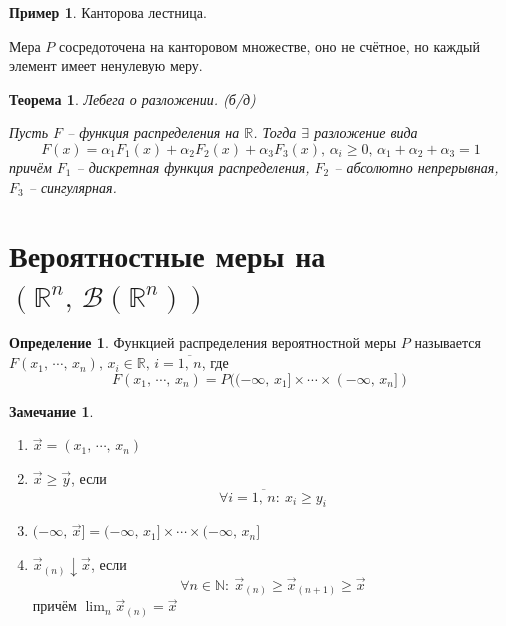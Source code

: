 \documentclass[a4paper,12pt]{article}
\renewcommand{\geq}{\ensuremath{\geqslant}}
\theoremstyle{plain}
\newtheorem{theorem}{Теорема}[section]
\theoremstyle{definition}
\newtheorem{definition}{Определение}[section]
\newtheorem*{note}{Замечание}
\newtheorem*{example}{Пример}
\theoremstyle{remark}
\begin{document}
\begin{example}
	Канторова лестница.

	Мера $P$ сосредоточена на канторовом множестве, оно не счётное, но каждый элемент имеет ненулевую меру.
\end{example}

\begin{theorem}
	Лебега о разложении. (б/д)

	Пусть $F$ -- функция распределения на $\mathbb{R}$. Тогда $\exists$ разложение вида
	\[F(x) = \alpha_1F_1(x) + \alpha_2F_2(x) + \alpha_3F_3(x),\, \alpha_i \geq 0,\, \alpha_1 + \alpha_2 + \alpha_3 = 1\]
	причём $F_1$ -- дискретная функция распределения, $F_2$ -- абсолютно непрерывная, $F_3$ -- сингулярная.
\end{theorem}

\section{Вероятностные меры на $(\mathbb{R}^n,\, \mathcal{B}(\mathbb{R}^n))$}
\begin{definition}
	Функцией распределения вероятностной меры $P$ называется $F(x_1,\,\cdots,\,x_n),\, x_i \in \mathbb{R},\, i = \overline{1,\,n}$, где
	\[F(x_1,\,\cdots,\,x_n) = P((-\infty,\,x_1]\times\cdots\times (-\infty,\, x_n])\]
\end{definition}

\begin{note}
	\begin{enumerate}
		\item $\vec{x} = (x_1,\,\cdots,\,x_n)$
		\item $\vec{x} \geq \vec{y}$, если
		      \[\forall i = \overline{1,\,n}:\: x_i \geq y_i\]
		\item $(-\infty,\,\vec{x}] = (-\infty,\,x_1]\times\cdots\times (-\infty,\, x_n]$
		\item $\vec{x}_{(n)} \downarrow \vec{x}$, если
		      \[\forall n \in \mathbb{N}:\: \vec{x}_{(n)} \geq \vec{x}_{(n + 1)} \geq \vec{x}\]
		      причём $\lim_n \vec{x}_{(n)} = \vec{x}$
	\end{enumerate}
\end{note}
\end{document}
